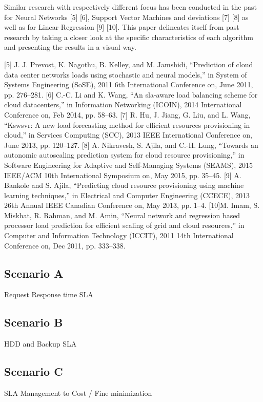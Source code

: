 

Similar research with respectively different focus has been conducted in the past for Neural Networks [5] [6], Support Vector Machines and deviations [7] [8] as well as for Linear Regression [9] [10]. This paper delineates itself from past research by taking a closer look at the specific characteristics of each algorithm and presenting the results in a visual way.

[5] J. J. Prevost, K. Nagothu, B. Kelley, and M. Jamshidi, “Prediction of
cloud data center networks loads using stochastic and neural models,”
in System of Systems Engineering (SoSE), 2011 6th International Conference
on, June 2011, pp. 276–281.
[6] C.-C. Li and K. Wang, “An sla-aware load balancing scheme for cloud
datacenters,” in Information Networking (ICOIN), 2014 International
Conference on, Feb 2014, pp. 58–63.
[7] R. Hu, J. Jiang, G. Liu, and L. Wang, “Kswsvr: A new load forecasting
method for efficient resources provisioning in cloud,” in Services Computing
(SCC), 2013 IEEE International Conference on, June 2013, pp.
120–127.
[8] A. Nikravesh, S. Ajila, and C.-H. Lung, “Towards an autonomic autoscaling
prediction system for cloud resource provisioning,” in Software
Engineering for Adaptive and Self-Managing Systems (SEAMS), 2015
IEEE/ACM 10th International Symposium on, May 2015, pp. 35–45.
[9] A. Bankole and S. Ajila, “Predicting cloud resource provisioning using
machine learning techniques,” in Electrical and Computer Engineering
(CCECE), 2013 26th Annual IEEE Canadian Conference on, May 2013,
pp. 1–4.
[10]M. Imam, S. Miskhat, R. Rahman, and M. Amin, “Neural network and
regression based processor load prediction for efficient scaling of grid
and cloud resources,” in Computer and Information Technology (ICCIT),
2011 14th International Conference on, Dec 2011, pp. 333–338.


\subsection{Scenario A}
Request Response time SLA


\subsection{Scenario B}
HDD and Backup SLA

\subsection{Scenario C}
SLA Management to Cost / Fine minimization